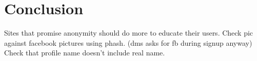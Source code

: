 \section{Conclusion}
\label{sec:conclusion}

Sites that promise anonymity should do more to educate their users. Check pic
against facebook pictures using phash. (dms asks for fb during signup anyway)
Check that profile name doesn't include real name.

